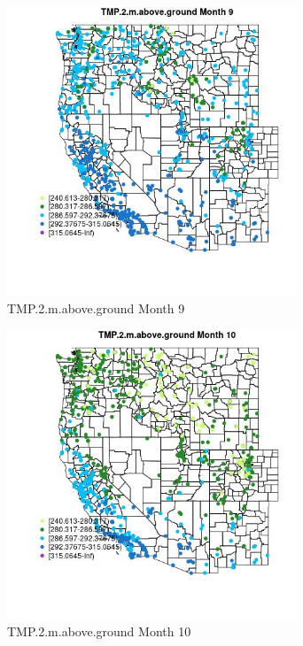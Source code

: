 \begin{figure} 
\centering  
\includegraphics[width=0.77\textwidth]{Code_Outputs/Report_ML_input_PM25_Step4_part_e_de_duplicated_aves_compiled_2019-05-21wNAs_MapObsMo9TMP2maboveground.jpg} 
\caption{\label{fig:Report_ML_input_PM25_Step4_part_e_de_duplicated_aves_compiled_2019-05-21wNAsMapObsMo9TMP2maboveground}TMP.2.m.above.ground Month 9} 
\end{figure} 
 

\clearpage 

\begin{figure} 
\centering  
\includegraphics[width=0.77\textwidth]{Code_Outputs/Report_ML_input_PM25_Step4_part_e_de_duplicated_aves_compiled_2019-05-21wNAs_MapObsMo10TMP2maboveground.jpg} 
\caption{\label{fig:Report_ML_input_PM25_Step4_part_e_de_duplicated_aves_compiled_2019-05-21wNAsMapObsMo10TMP2maboveground}TMP.2.m.above.ground Month 10} 
\end{figure} 
 

